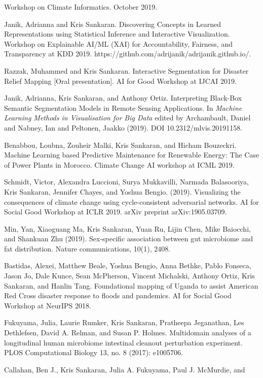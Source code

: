 \documentclass[letterpaper]{article}
\renewenvironment{itemize}{
  \begin{list}{}{
    \setlength{\leftmargin}{1.5em}
  }
}{
  \end{list}
}
\begin{document}
\begin{itemize}
\begin{itemize}
    Workshop on Climate Informatics. October 2019.
\item Janik, Adrianna and Kris Sankaran. Discovering Concepts in Learned
  Representations using Statistical Inference and Interactive Visualization.
  Workshop on Explainable AI/ML (XAI) for Accountability, Fairness, and
  Transparency at KDD 2019. https://github.com/adrijanik/adrijanik.github.io/.
  \item Razzak, Muhammed and Kris Sankaran. Interactive Segmentation for Disaster Relief Mapping [Oral presentation]. AI for Good Workshop at IJCAI 2019.
  \item Janik, Adrianna, Kris Sankaran, and Anthony Ortiz. Interpreting
    Black-Box Semantic Segmentation Models in Remote Sensing Applications. In
    \textit{Machine Learning Methods in Visualisation for Big Data} edited by
    Archambault, Daniel and Nabney, Ian and Peltonen, Jaakko (2019). DOI
    10.2312/mlvis.20191158.
  \item Benabbou, Loubna, Zouheir Malki, Kris Sankaran, and Hicham Bouzeckri.
    Machine Learning based Predictive Maintenance for Renewable Energy: The Case
    of Power Plants in Morocco. Climate Change AI workshop at ICML 2019.
  \item Schmidt, Victor, Alexandra Luccioni, Surya Mukkavilli, Narmada
    Balasooriya, Kris Sankaran, Jennifer Chayes, and Yoshua Bengio. (2019).
    Visualizing the consequences of climate change using cycle-consistent
    adversarial networks. AI for Social Good Workshop at ICLR 2019. arXiv
    preprint arXiv:1905.03709.
  \item Min, Yan, Xiaoguang Ma, Kris Sankaran, Yuan Ru, Lijin Chen, Mike Baiocchi, and Shankuan Zhu (2019). Sex-specific association between gut microbiome and fat distribution. Nature communications, 10(1), 2408.
  \item Bastidas, Alexei, Matthew Beale, Yoshua Bengio, Anna Bethke, Pablo
    Fonseca, Jason Jo, Dale Kunce, Sean McPherson, Vincent Michalski, Anthony
    Ortiz, Kris Sankaran, and Hanlin Tang. Foundational mapping of Uganda to
    assist American Red Cross disaster response to floods and pandemics. AI for
    Social Good Workshop at NeurIPS 2018.
  \item Fukuyama, Julia, Laurie Rumker, Kris Sankaran, Pratheepa Jeganathan, Les
    Dethlefsen, David A. Relman, and Susan P. Holmes. Multidomain analyses of a
    longitudinal human microbiome intestinal cleanout perturbation experiment.
    PLOS Computational Biology 13, no. 8 (2017): e1005706.
  \item Callahan, Ben J., Kris Sankaran, Julia A. Fukuyama, Paul J. McMurdie, and

\end{itemize}
\end{itemize}
\end{document}
